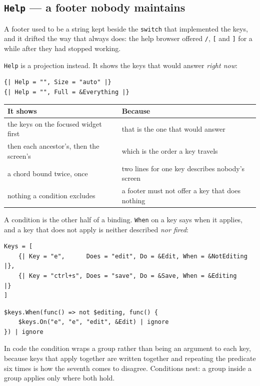 \documentclass[11pt,a4paper,twoside,openany]{book}
\newcommand{\code}[1]{\texttt{\small #1}}
\begin{document}
\subsection{\texttt{Help} --- a footer nobody maintains}

A footer used to be a string kept beside the \code{switch} that implemented the
keys, and it drifted the way that always does: the help browser offered \code{/},
\code{[} and \code{]} for a while after they had stopped working.

\code{Help} is a projection instead. It shows the keys that would answer
\emph{right now}:

\begin{lstlisting}
{| Help = "", Size = "auto" |}
{| Help = "", Full = &Everything |}
\end{lstlisting}

\begin{center}
\begin{tabular}{@{}ll@{}}
\toprule
\textbf{\normalfont\sffamily It shows} & \textbf{\normalfont\sffamily Because} \\
\midrule
the keys on the focused widget first & that is the one that would answer \\
then each ancestor's, then the screen's & which is the order a key travels \\
a chord bound twice, once             & two lines for one key describes nobody's screen \\
nothing a condition excludes          & a footer must not offer a key that does nothing \\
\bottomrule
\end{tabular}
\end{center}

A condition is the other half of a binding. \code{When} on a key says when it
applies, and a key that does not apply is neither described \emph{nor fired}:

\begin{lstlisting}
Keys = [
    {| Key = "e",      Does = "edit", Do = &Edit, When = &NotEditing |},
    {| Key = "ctrl+s", Does = "save", Do = &Save, When = &Editing    |}
]
\end{lstlisting}

\begin{lstlisting}
$keys.When(func() => not $editing, func() {
    $keys.On("e", "e", "edit", &Edit) | ignore
}) | ignore
\end{lstlisting}

\noindent In code the condition wraps a group rather than being an argument to
each key, because keys that apply together are written together and repeating the
predicate six times is how the seventh comes to disagree. Conditions nest: a group
inside a group applies only where both hold.
\end{document}
